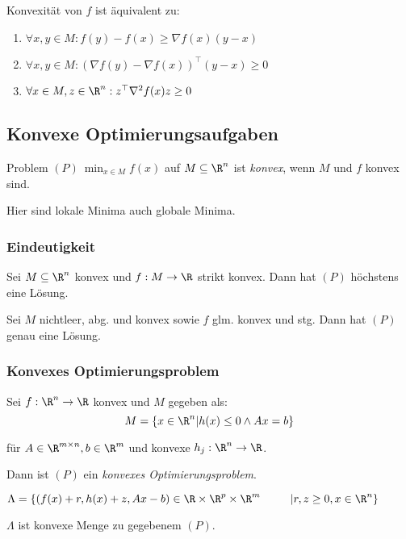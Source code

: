 Konvexität von \(f\) ist äquivalent zu:

\begin{enumerate}[label=(\alph*)]
\item \(\forall x, y \in M : f(y)-f(x) \geq \nabla f(x)(y-x)\)
\item \(\forall x, y \in M : (\nabla f(y) - \nabla f(x))^\top (y-x) \geq 0\)
\item \(\forall x \in M, z \in \R^n : z^\top \nabla^2 f(x)z \geq 0\)
\end{enumerate}

\subsection*{Konvexe Optimierungsaufgaben}

Problem \((P) \ \min_{x \in M} f(x)\) auf \(M \subseteq \R^n\) ist \emph{konvex}, wenn \(M\) und \(f\) konvex sind.

\spacing

Hier sind lokale Minima auch globale Minima.

\subsubsection*{Eindeutigkeit}

Sei \(M \subseteq \R^n\) konvex und \(f : M \to \R\) strikt konvex. Dann hat \((P)\) höchstens eine Lösung.

\spacing

Sei \(M\) nichtleer, abg. und konvex sowie \(f\) glm. konvex und stg. Dann hat \((P)\) genau eine Lösung.

\subsubsection*{Konvexes Optimierungsproblem}

Sei \(f : \R^n \to \R\) konvex und \(M\) gegeben als: \[M = \{x \in \R^n | h(x) \leq 0 \land Ax=b\}\]

für \(A \in \R^{m \times n}, b \in \R^m\) und konvexe \(h_j : \R^n \to \R\).

Dann ist \((P)\) ein \emph{konvexes Optimierungsproblem}.

\spacing

\(\Lambda = \{(f(x)+r, h(x)+z, Ax-b) \in \R \times \R^p \times \R^m \\ \phantom{\Delta = \{}| r, z \geq 0, x \in \R^n \}\)

\(\Lambda\) ist konvexe Menge zu gegebenem \((P)\).

